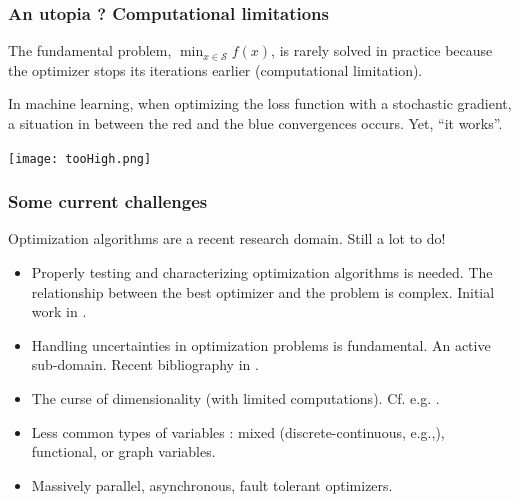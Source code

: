 \documentclass[12pt]{beamer}
\begin{document}
\begin{frame}
\frametitle{An utopia ? Computational limitations}
The fundamental problem, $ \min_{x \in \mathcal S } f(x) $,
is rarely solved in practice because the optimizer stops its iterations earlier (computational limitation).\\
\begin{minipage}{0.4\textwidth}
In machine learning, when optimizing the loss function with a stochastic gradient, a situation in between the red and the blue convergences occurs. Yet, ``it works''.
\end{minipage}
\hfill
\begin{minipage}{0.55\textwidth}
\texttt{[image: tooHigh.png]} 
\end{minipage}
\end{frame}


\begin{frame}
\frametitle{Some current challenges}
Optimization algorithms are a recent research domain. Still a lot to do!
\begin{itemize}
\item Properly testing and characterizing optimization algorithms is needed. The relationship between the best optimizer and the problem is complex. Initial work in {\scriptsize \cite{hansen2021coco,bosse2012relative,kerschke2019automated}}.
\item Handling uncertainties in optimization problems is fundamental. An active sub-domain. Recent bibliography in {\scriptsize \cite{pelamatti2022coupling}}.
\item The curse of dimensionality (with limited computations). Cf. e.g. {\scriptsize\cite{binois:hal-03419959}}.
\item Less common types of variables : mixed (discrete-continuous, e.g.,{\scriptsize\cite{cuesta2022comparison}}), functional, or graph variables.
\item Massively parallel, asynchronous, fault tolerant optimizers.
\end{itemize}
\end{frame}
\end{document}
